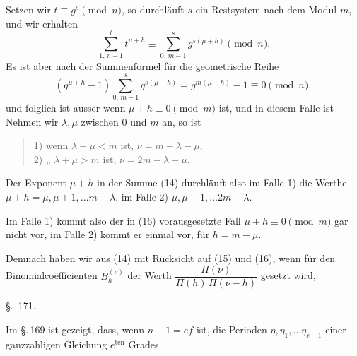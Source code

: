 
Setzen wir $t \equiv g^s \pmod{n}$, so durchl\"auft $s$ ein Restsystem nach dem Modul $m$, und wir erhalten
\[
\sum_{1,\,n-1}^{t} t^{\mu+h} \equiv \sum_{0,\,m-1}^{s} g^{s(\mu+h)} \pmod{n}.
\]
Es ist aber nach der Summenformel f\"ur die geometrische Reihe
\[
(g^{\mu+h} - 1) \sum_{0,\,m-1}^{s} g^{s(\mu+h)} = g^{m(\mu+h)} - 1 \equiv 0 \pmod{n},
\]
und folglich ist
ausser wenn $\mu + h \equiv 0 \pmod{m}$ ist, und in diesem Falle ist
Nehmen wir $\lambda, \mu$ zwischen $0$ und $m$ an, so ist
\begin{quote}
1) wenn $\lambda + \mu < m$ ist, \quad $\nu = m - \lambda - \mu$,\\
2) „ $\lambda + \mu > m$ ist, \quad $\nu = 2m - \lambda - \mu$.
\end{quote}
Der Exponent $\mu + h$ in der Summe (14) durchl\"auft also im Falle 1) die Werthe $\mu + h = \mu, \mu + 1, \ldots m - \lambda$, im Falle 2) $\mu, \mu + 1, \ldots 2m - \lambda$.

Im Falle 1) kommt also der in (16) vorausgesetzte Fall $\mu + h \equiv 0 \pmod{m}$ gar nicht vor, im Falle 2) kommt er einmal vor, f\"ur $h = m - \mu$.

Demnach haben wir aus (14) mit R\"ucksicht auf (15) und (16), wenn f\"ur den Binomialco\"efficienten $B_h^{(\nu)}$ der Werth $\dfrac{\Pi(\nu)}{\Pi(h)\,\Pi(\nu-h)}$ gesetzt wird,

\begin{center}
\S.\ 171.

\end{center}

Im \S.\,169 ist gezeigt, dass, wenn $n - 1 = ef$ ist, die Perioden $\eta, \eta_1, \ldots \eta_{e-1}$ einer ganzzahligen Gleichung $e^{\text{ten}}$ Grades

